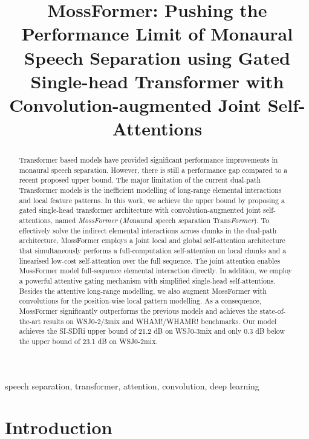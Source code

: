\documentclass[9pt]{extarticle}
\title{MossFormer: Pushing the Performance Limit of Monaural Speech Separation using Gated Single-head Transformer with Convolution-augmented Joint Self-Attentions}
\begin{document}
\maketitle
\begin{abstract}
Transformer based models have provided significant performance improvements in monaural speech separation. However, there is still a performance gap compared to a recent proposed upper bound. The major limitation of the current dual-path Transformer models is the inefficient modelling of long-range elemental interactions and local feature patterns. In this work, we achieve the upper bound by proposing a gated single-head transformer architecture with convolution-augmented joint self-attentions, named \textit{MossFormer} (\textit{Mo}naural \textit{s}peech \textit{s}eparation Trans\textit{Former}).  To effectively solve the indirect elemental interactions across chunks in the dual-path architecture, MossFormer employs a joint local and global self-attention architecture that simultaneously performs a full-computation self-attention on local chunks and a linearised low-cost self-attention over the full sequence. The joint attention enables MossFormer model full-sequence elemental interaction directly. In addition, we employ a powerful attentive gating mechanism with simplified single-head self-attentions. Besides the attentive long-range modelling, we also augment MossFormer with convolutions for the position-wise local pattern modelling. As a consequence, MossFormer significantly outperforms the previous models and achieves the state-of-the-art results on  WSJ0-2/3mix and WHAM!/WHAMR! benchmarks. Our model achieves the SI-SDRi upper bound of 21.2 dB on WSJ0-3mix and only 0.3 dB below the upper bound of 23.1 dB on WSJ0-2mix.
\end{abstract}   
\begin{keywords}
speech separation, transformer, attention, convolution, deep learning
\end{keywords}
\section{Introduction}
\label{sec:intro}
\end{document}
